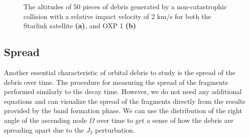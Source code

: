 \documentclass[a4paper, 12pt]{article}
\begin{document}
\begin{figure}[b!]
	\begin{adjustbox}{max width=1\linewidth,center}
		\centering     %
	\end{adjustbox}
	\caption{The altitudes of 50 pieces of debris generated by a non-catastrophic collision with a relative impact velocity of 2 km/s for both the Starlink satellite \textbf{(a)}, and OXP 1 \textbf{(b)} }
	\label{altitudes}
\end{figure}

\newpage
\subsection{Spread}
Another essential characteristic of orbital debris to study is the spread of the debris over time. The procedure for measuring the spread of the fragments performed similarly to the decay time. However, we do not need any additional equations and can visualize the spread of the fragments directly from the results provided by the band formation phase. We can use the distribution of the right angle of the ascending node $\Omega$ over time to get a sense of how the debris are spreading apart due to the $J_2$ perturbation.
\end{document}
